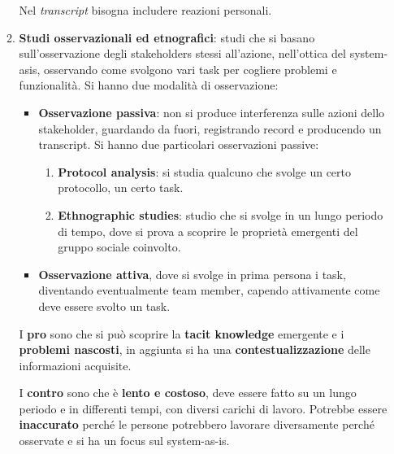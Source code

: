 \begin{itemize}
\begin{enumerate}
                        Nel \textit{transcript} bisogna includere reazioni personali.
                  \item \textbf{Studi osservazionali ed etnografici}: studi che si basano
                        sull'osservazione degli stakeholders stessi all'azione, nell'ottica del
                        system-asis, osservando come svolgono vari task per cogliere problemi e
                        funzionalità. Si hanno due modalità di osservazione:
                        \begin{itemize}
                              \item \textbf{Osservazione passiva}: non si produce interferenza
                                    sulle azioni dello stakeholder, guardando da fuori, registrando record e
                                    producendo un transcript. Si hanno due particolari osservazioni passive:
                                    \begin{enumerate}
                                    \item \textbf{Protocol analysis}: si studia qualcuno che svolge
                                          un certo protocollo, un certo task.
                                    \item \textbf{Ethnographic studies}: studio che si svolge in un
                                          lungo periodo di tempo, dove si prova a scoprire le proprietà
                                          emergenti del gruppo sociale coinvolto.
                                    \end{enumerate}
                              \item \textbf{Osservazione attiva}, dove si svolge in prima persona
                                    i task, diventando eventualmente team member, capendo attivamente
                                    come deve essere svolto un task.
                        \end{itemize}

                        I \textbf{pro} sono che si può scoprire la \textbf{tacit knowledge} 
                        emergente e i \textbf{problemi nascosti}, in aggiunta si 
                        ha una \textbf{contestualizzazione} delle informazioni 
                        acquisite. 

                        I \textbf{contro} sono che è \textbf{lento e costoso}, 
                        deve essere fatto su un lungo periodo e in differenti 
                        tempi, con diversi carichi di lavoro. Potrebbe essere 
                        \textbf{inaccurato} perché le persone potrebbero lavorare 
                        diversamente perché osservate e si ha un focus sul 
                        system-as-is. 
                        

\end{enumerate}
\end{itemize}
